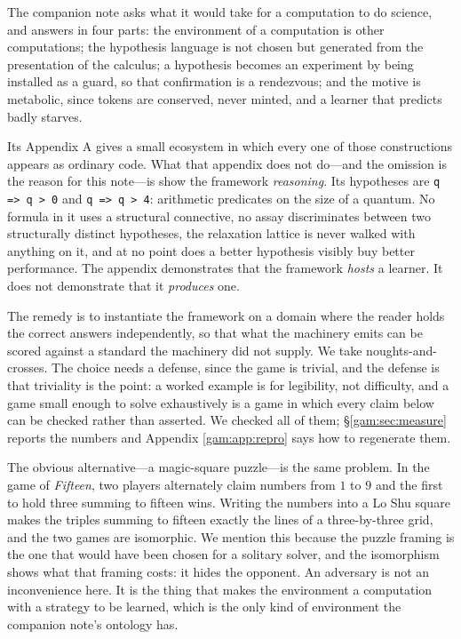 The companion note \chSci asks what it would take for a computation to
do science, and answers in four parts: the environment of a computation is other
computations; the hypothesis language is not chosen but generated from the
presentation of the calculus; a hypothesis becomes an experiment by being
installed as a guard, so that confirmation is a rendezvous; and the motive is
metabolic, since tokens are conserved, never minted, and a learner that predicts
badly starves.

Its Appendix A gives a small ecosystem in which every one of those constructions
appears as ordinary code. What that appendix does not do---and the omission is
the reason for this note---is show the framework \emph{reasoning}. Its
hypotheses are \texttt{q => q > 0} and \texttt{q => q > 4}: arithmetic
predicates on the size of a quantum. No formula in it uses a structural
connective, no assay discriminates between two structurally distinct
hypotheses, the relaxation lattice is never walked with anything on it, and at
no point does a better hypothesis visibly buy better performance. The appendix
demonstrates that the framework \emph{hosts} a learner. It does not demonstrate
that it \emph{produces} one.

The remedy is to instantiate the framework on a domain where the reader holds
the correct answers independently, so that what the machinery emits can be
scored against a standard the machinery did not supply. We take
noughts-and-crosses. The choice needs a defense, since the game is trivial, and
the defense is that triviality is the point: a worked example is for legibility,
not difficulty, and a game small enough to solve exhaustively is a game in which
every claim below can be checked rather than asserted. We checked all of them;
\S\ref{gam:sec:measure} reports the numbers and Appendix \ref{gam:app:repro} says how to
regenerate them.

\begin{remark}\label{gam:magic-square-comes-free}
The obvious alternative---a magic-square puzzle---is the same problem. In the
game of \emph{Fifteen}, two players alternately claim numbers from $1$ to $9$
and the first to hold three summing to fifteen wins. Writing the numbers into a
Lo Shu square makes the triples summing to fifteen exactly the lines of a
three-by-three grid, and the two games are isomorphic. We mention this because
the puzzle framing is the one that would have been chosen for a solitary
solver, and the isomorphism shows what that framing costs: it hides the
opponent. An adversary is not an inconvenience here. It is the thing that makes
the environment a computation with a strategy to be learned, which is the only
kind of environment the companion note's ontology has.
\end{remark}

